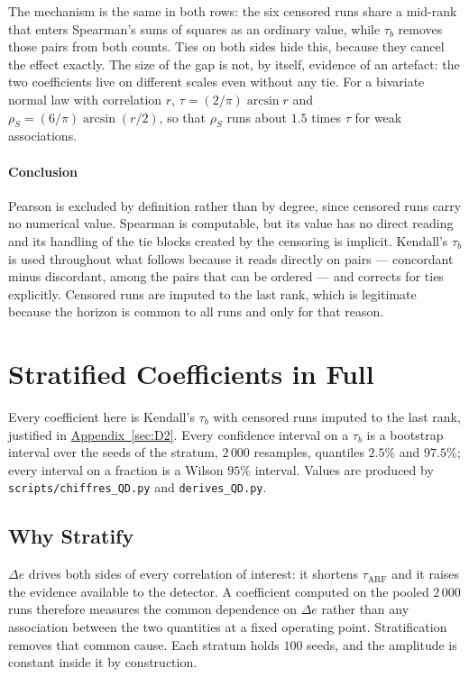 \documentclass[10pt,conference]{IEEEtran}
\theoremstyle{definition}
\begin{document}
The mechanism is the same in both rows: the six censored runs share a mid-rank that
enters Spearman's sums of squares as an ordinary value, while $\tau_b$ removes those pairs
from both counts. Ties on both sides hide this, because they cancel the effect exactly.
The size of the gap is not, by itself, evidence of an artefact: the two coefficients live
on different scales even without any tie. For a bivariate normal law with correlation $r$,
$\tau = (2/\pi)\arcsin r$ and $\rho_S = (6/\pi)\arcsin(r/2)$, so that $\rho_S$ runs about
$1.5$ times $\tau$ for weak associations.

\paragraph{Conclusion} Pearson is excluded by definition rather than by degree, since
censored runs carry no numerical value. Spearman is computable, but its value
has no direct reading and its handling of the tie blocks created by the censoring is
implicit. Kendall's $\tau_b$ is used throughout what follows because it reads directly on
pairs --- concordant minus discordant, among the pairs that can be ordered --- and corrects
for ties explicitly. Censored runs are imputed to the last rank, which is legitimate
because the horizon is common to all runs and only for that reason.

\section{Stratified Coefficients in Full}
\label{sec:D3}

Every coefficient here is Kendall's $\tau_b$ with censored runs imputed to the last rank,
justified in \hyperref[sec:D2]{Appendix~\ref*{sec:D2}}. Every confidence interval on a $\tau_b$ is a bootstrap
interval over the seeds of the stratum, $2\,000$ resamples, quantiles $2.5\%$ and
$97.5\%$; every interval on a fraction is a Wilson $95\%$ interval. Values are produced by
\texttt{scripts/chiffres\_QD.py} and \texttt{derives\_QD.py}.

\subsection{Why Stratify}

$\Delta e$ drives both sides of every correlation of interest: it shortens
$\tau_{\mathrm{ARF}}$ and it raises the evidence available to the detector. A coefficient
computed on the pooled $2\,000$ runs therefore measures the common dependence on
$\Delta e$ rather than any association between the two quantities at a fixed operating
point. Stratification removes that common cause. Each stratum holds $100$ seeds, and the
amplitude is constant inside it by construction.
\end{document}
